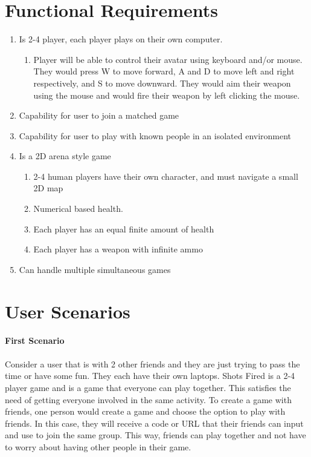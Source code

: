 \documentclass[11pt, oneside]{article}   	%
\begin{document}
\clearpage

\section{Functional Requirements}
\begin{enumerate}
\item Is 2-4 player, each player plays on their own computer. 
\begin{enumerate}
\item Player will be able to control their avatar using keyboard and/or mouse.
      They would press W to move forward, A and D to move left and right
      respectively, and S to move downward.  They would aim their weapon using the mouse
      and would fire their weapon by left clicking the mouse.
\end{enumerate}
\item Capability for user to join a matched game
\item Capability for user to play with known people in an isolated environment
\item Is a 2D arena style game
\begin{enumerate}
\item 2-4 human players have their own character, and must navigate a small 2D map
\item Numerical based health.
\item Each player has an equal finite amount of health
\item Each player has a weapon with infinite ammo
\end{enumerate}
\item Can handle multiple simultaneous games
\end{enumerate}

\section{User Scenarios}


\textbf{First Scenario}\\\\

Consider a user that is with 2 other friends and they are just trying to pass
the time or have some fun. They each have their own laptops. Shots Fired is a
2-4 player game and is a game that everyone can play together. This satisfies
the need of getting everyone involved in the same activity. To create a game
with friends, one person would create a game and choose the option to play with
friends. In this case, they will receive a code or URL that their friends can
input and use to join the same group. This way, friends can play together and
not have to worry about having other people in their game. \\\\
\end{document}
